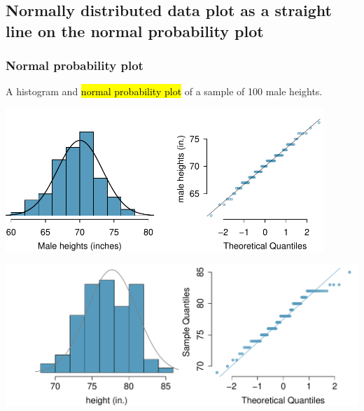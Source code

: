 \documentclass[11pt,containsverbatim,handout,xcolor=xelatex,dvipsnames,table]{beamer}
\begin{document}

\subsection{Normally distributed data plot as a straight line on the normal probability plot}
\label{mi5}


\begin{frame}
\frametitle{Normal probability plot}

A histogram and \hl{normal probability plot} of a sample of 100 male heights.

\begin{center}
\includegraphics[width=0.9\textwidth]{figures/fcidMHeights/fcidMHeights}
\end{center}


\end{frame}


\begin{frame}


\begin{center}
\includegraphics[width=\textwidth]{figures/qq_duke/qq_duke}
\end{center}

\vfill


\end{frame}
\end{document}
